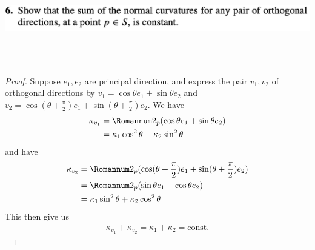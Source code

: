 \documentclass{report}
\begin{document}
\begin{question}{}{}
\includegraphics[height=4cm,width=18cm]{hw5q4}
\end{question}
\begin{proof}
Suppose $e_1,e_2$ are principal direction, and express the pair $v_1,v_2$ of orthogonal directions by  $v_1=\cos \theta e_1+ \sin \theta e_2$ and $v_2=\cos (\theta + \frac{\pi}{2}) e_1+ \sin (\theta + \frac{\pi}{2}) e_2$. We have 
\begin{align*}
\kappa_{v_1}&=\Sec_p (\cos \theta e_1+\sin \theta e_2)\\
&=\kappa_1 \cos^2 \theta + \kappa_2 \sin^2 \theta
\end{align*}
and have 
\begin{align*}
\kappa_{v_2}&=\Sec_p(\cos (\theta + \frac{\pi}{2})e_1+ \sin (\theta + \frac{\pi}{2})e_2)\\
&=\Sec_p (\sin \theta e_1+\cos \theta e_2)\\
&=\kappa_1 \sin^2 \theta + \kappa_2\cos^2 \theta 
\end{align*}
This then give us 
\begin{align*}
\kappa_{v_1}+\kappa_{v_2}= \kappa_1+ \kappa_2=\text{const.}
\end{align*}
\end{proof}
\end{document}
